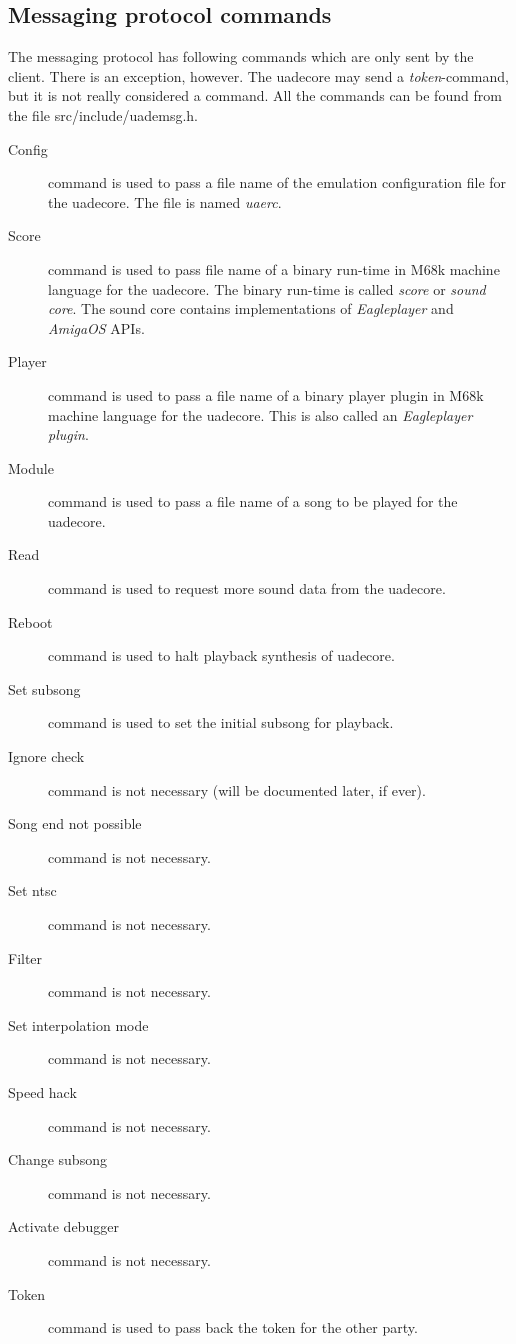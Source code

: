 \documentclass{article}
\begin{document}
\subsection{Messaging protocol commands}

The messaging protocol has following commands which are only sent by
the client. There is an exception, however. The uadecore may send a
\emph{token}-command, but it is not really considered a command.
All the commands can be found from the file \mbox{src/include/uademsg.h}.

\begin{description}
\item [Config] command is used to pass a file name of the emulation
configuration file for the uadecore. The file is named \emph{uaerc}.

\item [Score] command is used to pass file name of a binary run-time in M68k
machine language for the uadecore. The binary run-time is called
\emph{score} or \emph{sound core}. The sound core contains implementations of
\emph{Eagleplayer} and \emph{AmigaOS} APIs.

\item [Player] command is used to pass a file name of a binary player plugin
in M68k machine language for the uadecore. This is also called an
\emph{Eagleplayer plugin}.

\item [Module] command is used to pass a file name of a song to be played
for the uadecore.

\item [Read] command is used to request more sound data from the uadecore.

\item [Reboot] command is used to halt playback synthesis of uadecore.

\item [Set subsong] command is used to set the initial subsong for playback.

\item [Ignore check] command is not necessary (will be documented later,
if ever).
\item [Song end not possible] command is not necessary.
\item [Set ntsc] command is not necessary.
\item [Filter] command is not necessary.
\item [Set interpolation mode] command is not necessary.
\item [Speed hack] command is not necessary.
\item [Change subsong] command is not necessary.
\item [Activate debugger] command is not necessary.

\item [Token] command is used to pass back the token for the other party.
\end{description}
\end{document}
